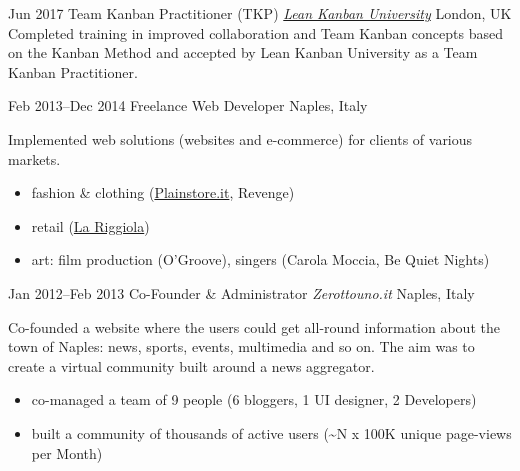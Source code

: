 \begin{entrylist}
\entry
{Jun 2017}
{Team Kanban Practitioner (TKP) {\normalfont \emph{\href{https://edu.leankanban.com/}{Lean Kanban University}}}}
{London, UK}
{Completed training in improved  collaboration  and  Team  Kanban concepts based on the Kanban Method and accepted by Lean Kanban University as a Team Kanban Practitioner.}

\entry
{Feb 2013--Dec 2014}
{Freelance Web Developer}
{Naples, Italy}
{Implemented web solutions (websites and e-commerce) for clients of various markets.
\vspace{-.2cm}
\begin{itemize}[leftmargin=.6cm]
	\item fashion \& clothing (\href{http://www.plainstore.it/}{Plainstore.it}, Revenge)
	\item retail (\href{http://www.la-riggiola.com/}{La Riggiola})
	\item art: film production (O'Groove), singers (Carola Moccia, Be Quiet Nights)
\end{itemize}
}

\entry
{Jan 2012--Feb 2013}
{Co-Founder \& Administrator {\normalfont \emph{Zerottouno.it}}}
{Naples, Italy}
{Co-founded a website where the users could get all-round information about the town of Naples: news, sports, events, multimedia and so on. The aim was to create a virtual community built around a news aggregator.  
\vspace{-.2cm}
\begin{itemize}[leftmargin=.6cm]
	\item co-managed a team of 9 people (6 bloggers, 1 UI designer, 2 Developers)
	\item built a community of thousands of active users (\textasciitilde N x 100K unique page-views per Month)	 
\end{itemize} 
}
\end{entrylist}